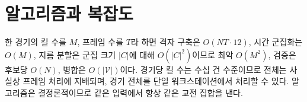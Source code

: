 
\section{알고리즘과 복잡도}
\label{sec:loc-algorithm}



한 경기의 킬 수를 $M$, 프레임 수를 $T$라 하면 격자 구축은 $O(NT \cdot 12)$, 시간 군집화는 $O(M)$, 지름 분할은 군집 크기 $|C|$에 대해 $O(|C|^2)$이므로 최악 $O(M^2)$, 검증은 후보당 $O(N)$, 병합은 $O(|\mathcal{V}|)$이다. 경기당 킬 수는 수십 건 수준이므로 전체는 사실상 프레임 처리에 지배되며, \numMatches{} 경기 전체를 단일 워크스테이션에서 처리할 수 있다. 알고리즘은 결정론적이므로 같은 입력에서 항상 같은 교전 집합을 낸다.
